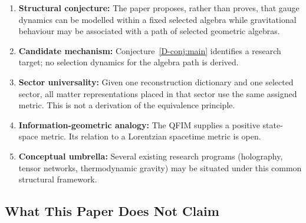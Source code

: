 \documentclass[12pt,a4paper,openany]{book}
\begin{document}
\begin{enumerate}
    \item \textbf{Structural conjecture:} The paper proposes, rather than proves, that gauge dynamics can be modelled within a fixed selected algebra while gravitational behaviour may be associated with a path of selected geometric algebras.
    
    \item \textbf{Candidate mechanism:} Conjecture~\ref{D-conj:main} identifies a research target; no selection dynamics for the algebra path is derived.
    
    \item \textbf{Sector universality:} Given one reconstruction dictionary and one selected sector, all matter representations placed in that sector use the same assigned metric.  This is not a derivation of the equivalence principle.
    
    \item \textbf{Information-geometric analogy:} The QFIM supplies a positive state-space metric.  Its relation to a Lorentzian spacetime metric is open.
    
    \item \textbf{Conceptual umbrella:} Several existing research programs (holography, tensor networks, thermodynamic gravity) may be situated under this common structural framework.
\end{enumerate}

\subsection{What This Paper Does Not Claim}
\end{document}
